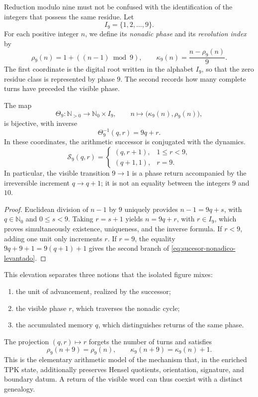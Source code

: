 Reduction modulo nine must not be confused with the identification of the
integers that possess the same residue. Let
\[
 I_9=\{1,2,\ldots,9\}.
\]
For each positive integer \(n\), we define its \emph{nonadic phase} and its
\emph{revolution index} by
\begin{equation}
 \rho_9(n)=1+((n-1)\bmod9),
 \qquad
 \kappa_9(n)=\frac{n-\rho_9(n)}9.
 \label{eq:coordenada-nonadica-levantada}
\end{equation}
The first coordinate is the digital root written in the alphabet
\(I_9\), so that the zero residue class is represented by phase \(9\).
The second records how many complete turns have preceded the
visible phase.

\begin{theorem}
\label{thm:descomposicion-nonadica-memoria}
The map
\[
 \Theta_9:\mathbb N_{>0}\longrightarrow\mathbb N_0\times I_9,
 \qquad
 n\longmapsto\bigl(\kappa_9(n),\rho_9(n)\bigr),
\]
is bijective, with inverse
\[
 \Theta_9^{-1}(q,r)=9q+r.
\]
In these coordinates, the arithmetic successor is conjugated with the dynamics.
\begin{equation}
 \mathcal S_9(q,r)=
 \begin{cases}
  (q,r+1),&1\leq r<9,\\
  (q+1,1),&r=9.
 \end{cases}
 \label{eq:sucesor-nonadico-levantado}
\end{equation}
In particular, the visible transition \(9\to1\) is a phase return accompanied
by the irreversible increment \(q\to q+1\); it is not an equality between the
integers \(9\) and \(10\).
\end{theorem}

\begin{proof}
Euclidean division of \(n-1\) by \(9\) uniquely provides
\(n-1=9q+s\), with \(q\in\mathbb N_0\) and \(0\leq s<9\). Taking
\(r=s+1\) yields \(n=9q+r\), with \(r\in I_9\), which proves simultaneously
existence, uniqueness, and the inverse formula. If \(r<9\), adding one unit only
increments \(r\). If \(r=9\), the equality
\(9q+9+1=9(q+1)+1\) gives the second branch of
\cref{eq:sucesor-nonadico-levantado}.
\end{proof}

This elevation separates three notions that the isolated figure mixes:
\begin{enumerate}
\item the unit of advancement, realized by the successor;
\item the visible phase \(r\), which traverses the nonadic cycle;
\item the accumulated memory \(q\), which distinguishes returns of the same phase.
\end{enumerate}
The projection \((q,r)\mapsto r\) forgets the number of turns and satisfies
\[
 \rho_9(n+9)=\rho_9(n),
 \qquad
 \kappa_9(n+9)=\kappa_9(n)+1.
\]
This is the elementary arithmetic model of the mechanism that, in the enriched
TPK state, additionally preserves Hensel quotients, orientation, signature, and
boundary datum. A return of the visible word can thus coexist with a
distinct genealogy.

